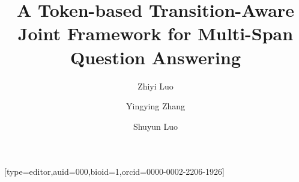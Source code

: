 \documentclass[a4paper]{cas-sc}
\newcommand{\1}[1]{\mathds{1}\left[#1\right]}
\begin{document}
	\let\WriteBookmarks\relax
	\def\floatpagepagefraction{1}
	\def\textpagefraction{.001}
	
	
	
	\title{A Token-based Transition-Aware Joint Framework for Multi-Span Question Answering}  
	
	\author{Zhiyi Luo}[type=editor,auid=000,bioid=1,orcid=0000-0002-2206-1926]
	
	\author{Yingying Zhang}
	
	\author{Shuyun Luo}
	\cormark[1]
	
	\address[mymainaddress]{School of Computer Science and Technology and the Key Laboratory of Intelligent Textile and Flexible Interconnection of Zhejiang Province, Zhejiang Sci-Tech University}
	\address[mysecondaryaddress]{No. 928, No. 2 street, Baiyang street, Qiantang New District, Hangzhou 310018, China}
	
\end{document}
